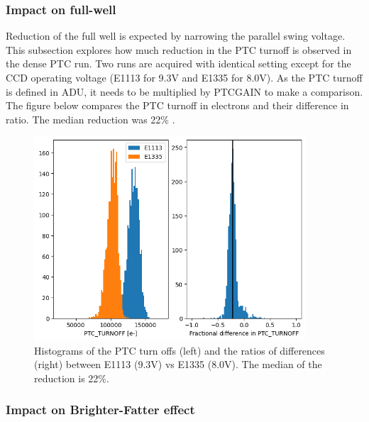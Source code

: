 


\subsubsection{Impact on full-well}\label{impact-on-full-well}

Reduction of the full well is expected by narrowing the parallel swing
voltage. This subsection explores how much reduction in the PTC turnoff
is observed in the dense PTC run. Two runs are acquired with identical
setting except for the CCD operating voltage (E1113 for 9.3V and E1335
for 8.0V). As the PTC turnoff is defined in ADU, it needs to be
multiplied by PTC\label{gain}{GAIN} to make a comparison.
The figure below compares the PTC turnoff in electrons and their
difference in ratio. The median reduction was 22\% .

\begin{figure}
\begin{centering}
\includegraphics[width=0.9\textwidth]{sections/figures/PtcTurnoffRatio.png}
\end{centering}
\caption{Histograms of the PTC turn offs (left) and the ratios of
differences (right) between E1113 (9.3V) vs E1335 (8.0V). The median of
the reduction is 22\%.}
\end{figure}

\subsubsection{Impact on Brighter-Fatter
effect}\label{impact-on-brighter-fatter-effect}

